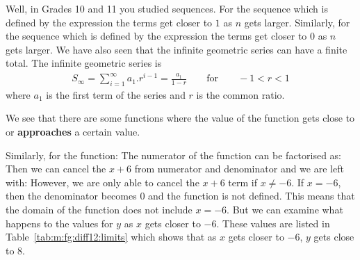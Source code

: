 Well, in Grades 10 and 11 you studied sequences. For the sequence
which is defined by the expression
the terms get closer to $1$ as $n$ gets larger. Similarly, for the sequence
which is defined by the expression
the terms get closer to $0$ as $n$ gets larger. We have also seen that the infinite geometric series can have a finite total. The infinite geometric series is
\begin{eqnarray*}
S_\infty = \sum_{i=1}^\infty a_1.r^{i-1} = \frac {a_1}{1-r} \qquad \mathrm{ for } \qquad -1 < r < 1 \end{eqnarray*}
where $a_1$ is the first term of the series and $r$ is the common ratio.

We see that there are some functions where the value of the function gets close to or \textbf{approaches} a certain value.

Similarly, for the function:
The numerator of the function can be factorised as:
Then we can cancel the $x+6$ from numerator and denominator and we are left with:
However, we are only able to cancel the $x+6$ term if $x\ne-6$. If $x=-6$, then the denominator becomes $0$ and the function is not defined. This means that the domain of the function does not include $x=-6$. But we can examine what happens to the values for $y$ as $x$ gets closer to $-6$. These values are listed in Table~\ref{tab:m:fg:diff12:limits} which shows that as $x$ gets closer to $-6$, $y$ gets close to 8. 

